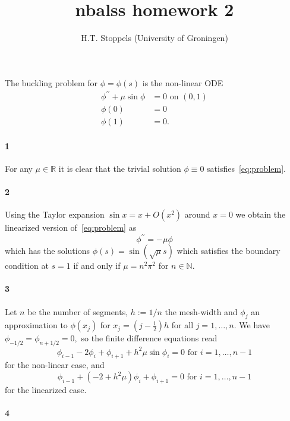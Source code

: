 \documentclass[a4paper]{article}
\author{H.T. Stoppels (University of Groningen)}
\title{{\sc nbalss} homework 2}
\begin{document}
  \maketitle
  
  The buckling problem for $\phi = \phi(s)$ is the non-linear ODE
  \begin{equation}\label{eq:problem}
  \begin{aligned}
    \phi^{\prime\prime} + \mu \sin \phi &= 0 \text{ on } (0, 1) \\
    \phi(0) &= 0 \\
    \phi(1) &= 0.
  \end{aligned}
  \end{equation}

  \paragraph{1} For any $\mu \in \mathbb{R}$ it is clear that the trivial solution $\phi \equiv 0$ satisfies~\eqref{eq:problem}.

  \paragraph{2} Using the Taylor expansion $\sin x = x + O(x^2)$ around $x = 0$ we obtain the linearized version of~\eqref{eq:problem} as $$\phi^{\prime\prime} = - \mu \phi$$
  which has the solutions $\phi(s) = \sin(\sqrt{\mu}s)$ which satisfies the boundary condition at $s = 1$ if and only if $\mu = n^2\pi^2$ for $n \in \mathbb{N}.$

  \paragraph{3} Let $n$ be the number of segments, $h := 1 / n$ the mesh-width and $\phi_j$ an approximation to $\phi(x_j)$ for $x_j = (j-\tfrac{1}{2})h$ for all $j = 1, \dots, n.$ We have $\phi_{-1/2} = \phi_{n + 1/2} = 0,$ so the finite difference equations read
  \begin{equation}
    \phi_{i-1} - 2 \phi_i + \phi_{i + 1} + h^2 \mu \sin \phi_i = 0 \text{ for } i = 1, \dots, n - 1
  \end{equation}
  for the non-linear case, and
  \begin{equation}
    \phi_{i-1} + (-2 + h^2 \mu)\phi_i + \phi_{i + 1} = 0 \text{ for } i = 1, \dots, n - 1
  \end{equation}
  for the linearized case.

  \paragraph{4}
\end{document}
